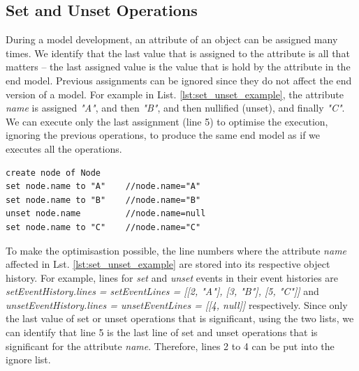 \documentclass{llncs}
\begin{document}
\subsection{Set and Unset Operations}
\label{subsec:set_and_unset_operations}
During a model development, an attribute of an object can be assigned many times. We identify that the last value that is assigned to the attribute is all that matters -- the last assigned value is the value that is hold by the attribute in the end model. Previous assignments can be ignored since they do not affect the end version of a model. For example in List. \ref{lst:set_unset_example}, the attribute \emph{name} is assigned \emph{"A"}, and then \emph{"B"}, and then nullified (unset), and finally \emph{"C"}. We can execute only the last assignment (line 5) to optimise the execution, ignoring the previous operations, to produce the same end model as if we executes all the operations. 

\begin{lstlisting}[style=eol,caption={Example of CBP representation of \emph{name} attribute assignments.},label=lst:set_unset_example]
create node of Node
set node.name to "A"    //node.name="A"    
set node.name to "B"    //node.name="B"
unset node.name         //node.name=null
set node.name to "C"    //node.name="C"
\end{lstlisting}

To make the optimisastion possible, the line numbers where the attribute \emph{name} affected in Lst. \ref{lst:set_unset_example} are stored into its respective object history.  For example, lines for \emph{set} and \emph{unset} events in their event histories are \emph{setEventHistory.lines = setEventLines = [[2, "A"], [3, "B"], [5, "C"]]} and \emph{unsetEventHistory.lines = unsetEventLines = [[4, null]]} respectively. Since only the last value of set or unset operations that is significant, using the two lists, we can identify that line 5 is the last line of set and unset operations that is significant for the attribute \emph{name}. Therefore, lines 2 to 4 can be put into the ignore list.  
\end{document}
